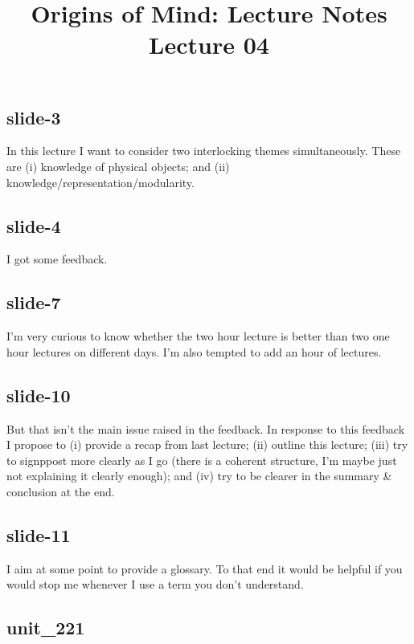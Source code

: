 \documentclass[12pt,\papersize]{extarticle}
\begin{document}
\setlength\footnotesep{1em}









\title {Origins of Mind: Lecture Notes \\ Lecture 04}
 
\maketitle
 
 
\subsection{slide-3}
In this lecture I want to consider two interlocking themes simultaneously.
These are (i) knowledge of physical objects; and (ii) knowledge/representation/modularity.
 
 
\subsection{slide-4}
I got some feedback.
 
 
\subsection{slide-7}
I'm very curious to know whether the two hour lecture is better than two one hour lectures on different days.
I'm also tempted to add an hour of lectures.
 
 
\subsection{slide-10}
But that isn't the main issue raised in the feedback.
In response to this feedback I propose to (i) provide a recap from last lecture; (ii) outline this lecture; (iii) try to signppost more clearly as I go (there is a coherent structure, I'm maybe just not explaining it clearly enough); and (iv) try to be clearer in the summary \& conclusion at the end.
 
 
\subsection{slide-11}
I aim at some point to provide a glossary.
To that end it would be helpful if you would stop me whenever I use a term you don't understand.
 
 
\subsection{unit\_221}
 
\end{document}
